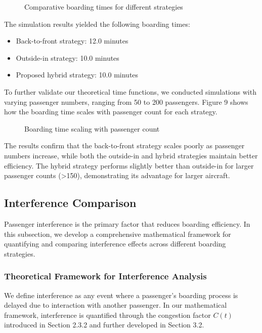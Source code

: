 \begin{figure}[h]
\centering
\caption{Comparative boarding times for different strategies}
\label{fig:boarding_time_comparison}
\end{figure}

The simulation results yielded the following boarding times:
\begin{itemize}
    \item Back-to-front strategy: 12.0 minutes
    \item Outside-in strategy: 10.0 minutes
    \item Proposed hybrid strategy: 10.0 minutes
\end{itemize}

To further validate our theoretical time functions, we conducted simulations with varying passenger numbers, ranging from 50 to 200 passengers. Figure 9 shows how the boarding time scales with passenger count for each strategy.

\begin{figure}[h]
\centering
\caption{Boarding time scaling with passenger count}
\label{fig:boarding_time_scaling}
\end{figure}

The results confirm that the back-to-front strategy scales poorly as passenger numbers increase, while both the outside-in and hybrid strategies maintain better efficiency. The hybrid strategy performs slightly better than outside-in for larger passenger counts (>150), demonstrating its advantage for larger aircraft.

\subsection{Interference Comparison}

Passenger interference is the primary factor that reduces boarding efficiency. In this subsection, we develop a comprehensive mathematical framework for quantifying and comparing interference effects across different boarding strategies.

\subsubsection{Theoretical Framework for Interference Analysis}

We define interference as any event where a passenger's boarding process is delayed due to interaction with another passenger. In our mathematical framework, interference is quantified through the congestion factor $C(t)$ introduced in Section 2.3.2 and further developed in Section 3.2.

